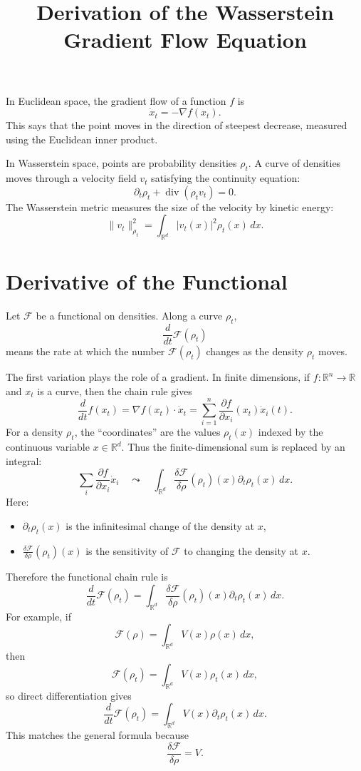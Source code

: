 \documentclass[11pt]{article}
\title{Derivation of the Wasserstein Gradient Flow Equation}
\author{}
\date{}
\begin{document}
\maketitle

In Euclidean space, the gradient flow of a function $f$ is
\[
\dot x_t=-\nabla f(x_t).
\]
This says that the point moves in the direction of steepest decrease, measured
using the Euclidean inner product.

In Wasserstein space, points are probability densities $\rho_t$. A curve of
densities moves through a velocity field $v_t$ satisfying the continuity
equation:
\[
\partial_t\rho_t+\operatorname{div}(\rho_t v_t)=0.
\]
The Wasserstein metric measures the size of the velocity by kinetic energy:
\[
\|v_t\|_{\rho_t}^2
=
\int_{\mathbb R^d}|v_t(x)|^2\rho_t(x)\,dx.
\]

\section*{Derivative of the Functional}

Let $\mathcal F$ be a functional on densities. Along a curve $\rho_t$,
\[
\frac{d}{dt}\mathcal F(\rho_t)
\]
means the rate at which the number $\mathcal F(\rho_t)$ changes as the density
$\rho_t$ moves.

The first variation plays the role of a gradient. In finite dimensions, if
$f:\mathbb R^n\to\mathbb R$ and $x_t$ is a curve, then the chain rule gives
\[
\frac{d}{dt}f(x_t)
=
\nabla f(x_t)\cdot \dot x_t
=
\sum_{i=1}^n
\frac{\partial f}{\partial x_i}(x_t)\dot x_i(t).
\]
For a density $\rho_t$, the ``coordinates'' are the values $\rho_t(x)$ indexed
by the continuous variable $x\in\mathbb R^d$. Thus the finite-dimensional sum
is replaced by an integral:
\[
\sum_i
\frac{\partial f}{\partial x_i}\dot x_i
\quad\leadsto\quad
\int_{\mathbb R^d}
\frac{\delta\mathcal F}{\delta\rho}(\rho_t)(x)
\partial_t\rho_t(x)\,dx.
\]
Here:
\begin{itemize}
    \item $\partial_t\rho_t(x)$ is the infinitesimal change of the density at $x$,
    \item $\frac{\delta\mathcal F}{\delta\rho}(\rho_t)(x)$ is the sensitivity of
    $\mathcal F$ to changing the density at $x$.
\end{itemize}
Therefore the functional chain rule is
\[
\frac{d}{dt}\mathcal F(\rho_t)
=
\int_{\mathbb R^d}
\frac{\delta\mathcal F}{\delta\rho}(\rho_t)(x)
\partial_t\rho_t(x)\,dx.
\]
For example, if
\[
\mathcal F(\rho)=\int_{\mathbb R^d}V(x)\rho(x)\,dx,
\]
then
\[
\mathcal F(\rho_t)=\int_{\mathbb R^d}V(x)\rho_t(x)\,dx,
\]
so direct differentiation gives
\[
\frac{d}{dt}\mathcal F(\rho_t)
=
\int_{\mathbb R^d}V(x)\partial_t\rho_t(x)\,dx.
\]
This matches the general formula because
\[
\frac{\delta\mathcal F}{\delta\rho}=V.
\]
\end{document}
